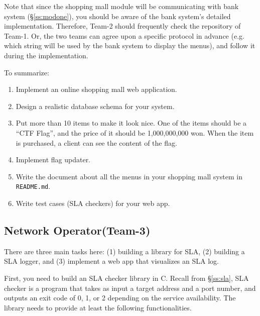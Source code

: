 \documentclass[a4paper, 11pt]{article}
\newcommand*{\Modthree}{Network Operator\xspace}%
\theoremstyle{definition}
\begin{document}
{Note that since the shopping mall module will be communicating with
bank system (\S\ref{ss:modone}), you should be aware of the bank
system's detailed implementation. Therefore, Team-2 should frequently
check the repository of Team-1. Or, the two teams can agree upon a
specific protocol in advance (e.g. which string will be used by the
bank system to display the menus), and follow it during the
implementation.

To summarize:
\begin{enumerate}

  \item Implement an online shopping mall web application.

  \item Design a realistic database schema for your system.

  \item Put more than 10 items to make it look nice. One of the items
    should be a ``CTF Flag'', and the price of it should be
    1,000,000,000 won. When the item is purchased, a client can see
    the content of the flag.

  \item Implement flag updater.

  \item Write the document about all the menus in your shopping mall
    system in \texttt{README.md}.

  \item Write test cases (SLA checkers) for your web app.

\end{enumerate}

\subsection{\Modthree (Team-3)} \label{ss:modthree}

There are three main tasks here: (1) building a library for SLA, (2)
building a SLA logger, and (3) implement a web app that visualizes an
SLA log.

First, you need to build an SLA checker library in C. Recall from
\S\ref{ss:sla}, SLA checker is a program that takes as input a target
address and a port number, and outputs an exit code of 0, 1, or 2
depending on the service availability. The library needs to provide at
least the following functionalities.

}
\end{document}
